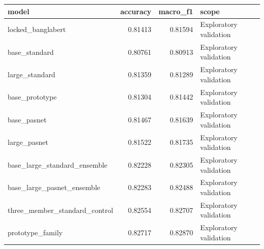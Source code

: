 \begin{tabular}{lrrl}
\toprule
model & accuracy & macro\_f1 & scope \\
\midrule
locked\_banglabert & 0.81413 & 0.81594 & Exploratory validation \\
base\_standard & 0.80761 & 0.80913 & Exploratory validation \\
large\_standard & 0.81359 & 0.81289 & Exploratory validation \\
base\_prototype & 0.81304 & 0.81442 & Exploratory validation \\
base\_pasnet & 0.81467 & 0.81639 & Exploratory validation \\
large\_pasnet & 0.81522 & 0.81735 & Exploratory validation \\
base\_large\_standard\_ensemble & 0.82228 & 0.82305 & Exploratory validation \\
base\_large\_pasnet\_ensemble & 0.82283 & 0.82488 & Exploratory validation \\
three\_member\_standard\_control & 0.82554 & 0.82707 & Exploratory validation \\
prototype\_family & 0.82717 & 0.82870 & Exploratory validation \\
\bottomrule
\end{tabular}
